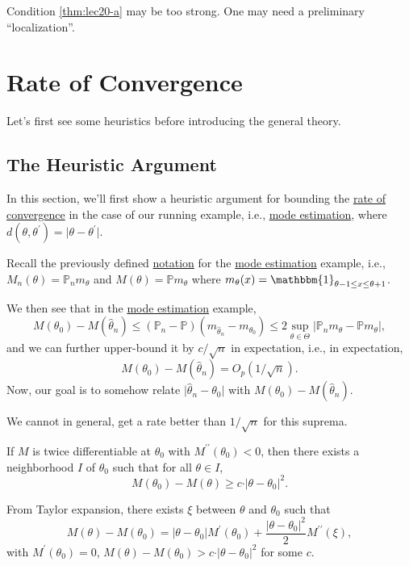 \begin{remark}
	Condition \autoref{thm:lec20-a} may be too strong. One may need a preliminary ``localization''.
\end{remark}

\section{Rate of Convergence}
Let's first see some heuristics before introducing the general theory.

\subsection{The Heuristic Argument}
In this section, we'll first show a heuristic argument for bounding the \hyperref[def:rate-of-convergence]{rate of convergence} in the case of our running example, i.e., \hyperref[eg:mode-estimation]{mode estimation}, where \(d(\theta , \theta ^{\prime} ) = \vert \theta - \theta ^{\prime} \vert \).

\begin{prev}
	Recall the previously defined \hyperref[not:M-estimation]{notation} for the \hyperref[eg:mode-estimation]{mode estimation} example, i.e., \(M_n(\theta ) = \mathbb{P} _n m_\theta \) and \(M(\theta ) = \mathbb{P} m_\theta \) where \(m_\theta (x) = \mathbbm{1}_{\theta -1 \leq x \leq \theta +1} \).
\end{prev}

We then see that in the \hyperref[eg:mode-estimation]{mode estimation} example,
\[
	M(\theta _0) - M(\hat{\theta} _n)
	\leq (\mathbb{P} _n - \mathbb{P} ) (m_{\hat{\theta } _n } - m_{\theta _0})
	\leq 2 \sup _{\theta \in \Theta } \vert \mathbb{P} _n m_\theta - \mathbb{P} m_\theta \vert,
\]
and we can further upper-bound it by \(c / \sqrt{n} \) in expectation, i.e., in expectation,
\[
	M(\theta _0) - M(\hat{\theta } _n ) = O_p(1 / \sqrt{n} ).
\]
Now, our goal is to somehow relate \(\vert \hat{\theta} _n - \theta _0 \vert \) with \(M(\theta _0) - M(\hat{\theta} _n)\).

\begin{note}
	We cannot in general, get a rate better than \(1 / \sqrt{n} \) for this suprema.
\end{note}

\begin{remark}
	If \(M\) is twice differentiable at \(\theta _0\) with \(M^{\prime\prime} (\theta _0) < 0\), then there exists a neighborhood \(I\) of \(\theta _0\) such that for all \(\theta \in I\),
	\[
		M(\theta _0) - M(\theta ) \geq c \cdot \vert \theta - \theta _0 \vert ^2.
	\]
\end{remark}
\begin{explanation}
	From Taylor expansion, there exists \(\xi \) between \(\theta \) and \(\theta _0\) such that
	\[
		M(\theta ) - M(\theta _0)
		=  \vert \theta - \theta _0 \vert M^{\prime} (\theta _0) + \frac{ \vert \theta - \theta _0 \vert ^2}{2} M^{\prime\prime} (\xi ),
	\]
	with \(M^{\prime} (\theta _0) = 0\), \(M(\theta ) - M(\theta _0) > c \cdot \vert \theta - \theta _0 \vert ^2\) for some \(c\).
\end{explanation}

